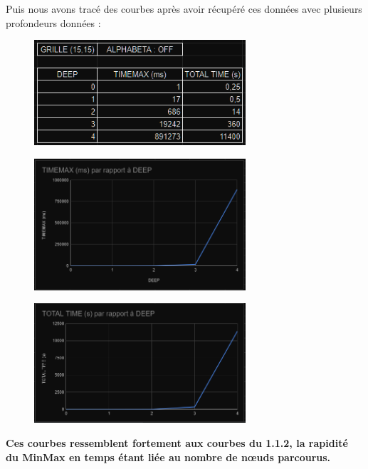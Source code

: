 Puis nous avons tracé des courbes après avoir récupéré ces données avec plusieurs profondeurs données :





\begin{figure}[!ht]
\begin{center}
\includegraphics[width=0.70\textwidth]{./TABLEURDONNEESCOURBES} 
\end{center}
\end{figure}

\begin{figure}[!ht]
\begin{center}
\includegraphics[width=0.70\textwidth]{./TIMEMAXPERDEEP} 
\end{center}
\end{figure}
\newpage

\begin{figure}[!ht]
\begin{center}
\includegraphics[width=0.70\textwidth]{./TOTALTIMEPERDEEP}
\end{center}
\end{figure}

\textbf{Ces courbes ressemblent fortement aux courbes du 1.1.2, la rapidité du MinMax en temps étant liée au nombre de nœuds parcourus.}



























